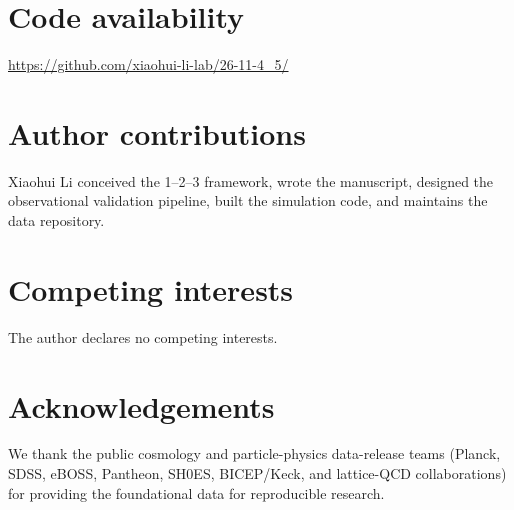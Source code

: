 \documentclass[11pt,a4paper]{article}
\begin{document}
\section*{Code availability}
\url{https://github.com/xiaohui-li-lab/26-11-4_5/}

\section*{Author contributions}
Xiaohui Li conceived the 1--2--3 framework, wrote the manuscript, designed the observational validation pipeline, built the simulation code, and maintains the data repository.

\section*{Competing interests}
The author declares no competing interests.

\section*{Acknowledgements}
We thank the public cosmology and particle-physics data-release teams (Planck, SDSS, eBOSS, Pantheon, SH0ES, BICEP/Keck, and lattice-QCD collaborations) for providing the foundational data for reproducible research.
\end{document}

